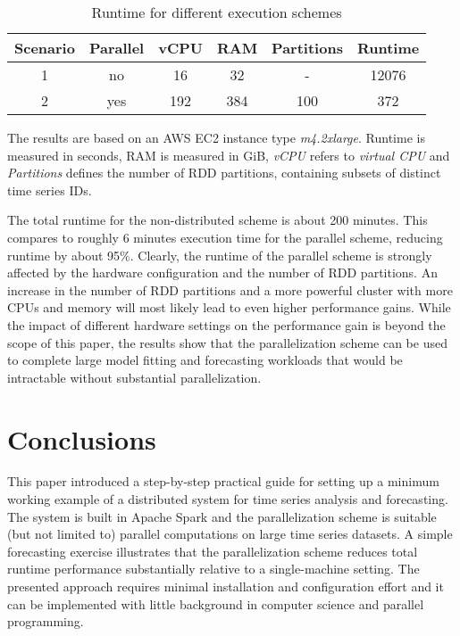 \documentclass[11pt]{article}
\begin{document}
\begin{table}[H]
  \begin{center}
  \begin{threeparttable}
    \caption{Runtime for different execution schemes}
    \label{tab:table1}
    \begin{tabular}{c|c|c|c|c|c}
        \toprule
      \textbf{Scenario} & \textbf{Parallel}& \textbf{vCPU} & \textbf{RAM} & \textbf{Partitions} & \textbf{Runtime}\\ 
      \hline
      1 & no & 16 & 32 & - & 12076 \\ 
      2 & yes & 192 & 384 & 100 & 372 \\ 
        \bottomrule
     \end{tabular}
    \begin{tablenotes}
      \small
      \item The results are based on an AWS EC2 instance type \emph{m4.2xlarge}. Runtime is measured in seconds, RAM is measured in GiB, \emph{vCPU} refers to \emph{virtual CPU} and \emph{Partitions} defines the number of RDD partitions, containing subsets of distinct time series IDs.  
    \end{tablenotes}
  \end{threeparttable}
  \end{center}
\end{table}

The total runtime for the non-distributed scheme is about 200 minutes. This compares to roughly 6 minutes execution time for the parallel scheme, reducing runtime by about 95\%. Clearly, the runtime of the parallel scheme is strongly affected by the hardware configuration and the number of RDD partitions. An increase in the number of RDD partitions and a more powerful cluster with more CPUs and memory will most likely lead to even higher performance gains. While the impact of different hardware settings on the performance gain is beyond the scope of this paper, the results show that the parallelization scheme can be used to complete large model fitting and forecasting workloads that would be intractable without substantial parallelization.      


\section{Conclusions}
\label{sec:conclusions}

This paper introduced a step-by-step practical guide for setting up a minimum working example of a distributed system for time series analysis and forecasting. The system is built in Apache Spark and the parallelization scheme is suitable (but not limited to) parallel computations on large time series datasets. A simple forecasting exercise illustrates that the parallelization scheme reduces total runtime performance substantially relative to a single-machine setting. The presented approach requires minimal installation and configuration effort and it can be implemented with little background in computer science and parallel programming. 



\clearpage





\end{document}
